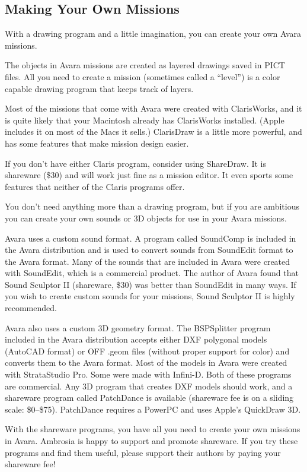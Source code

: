 \documentclass{article}
\begin{document}
\subsection{Making Your Own Missions}
With a drawing program and a little imagination, you can create your own Avara missions.

The objects in Avara missions are created as layered drawings saved in PICT files. All you need to create a mission (sometimes called a ``level'') is a color capable drawing program that keeps track of layers.

Most of the missions that come with Avara were created with ClarisWorks, and it is quite likely that your Macintosh already has ClarisWorks installed. (Apple includes it on most of the Macs it sells.) ClarisDraw is a little more powerful, and has some features that make mission design easier.

If you don't have either Claris program, consider using ShareDraw. It is shareware (\$30) and will work just fine as a mission editor. It even sports some features that neither of the Claris programs offer.

You don't need anything more than a drawing program, but if you are ambitious you can create your own sounds or 3D objects for use in your Avara missions.

Avara uses a custom sound format. A program called SoundComp is included in the Avara distribution and is used to convert sounds from SoundEdit format to the Avara format. Many of the sounds that are included in Avara were created with SoundEdit, which is a commercial product. The author of Avara found that Sound Sculptor II (shareware, \$30) was better than SoundEdit in many ways. If you wish to create custom sounds for your missions, Sound Sculptor II is highly recommended.

Avara also uses a custom 3D geometry format. The BSPSplitter program included in the Avara distribution accepts either DXF polygonal models (AutoCAD format) or OFF .geom files (without proper support for color) and converts them to the Avara format. Most of the models in Avara were created with StrataStudio Pro. Some were made with Infini-D. Both of these programs are commercial. Any 3D program that creates DXF models should work, and a shareware program called PatchDance is available (shareware fee is on a sliding scale: \$0--\$75). PatchDance requires a PowerPC and uses Apple's QuickDraw 3D.

With the shareware programs, you have all you need to create your own missions in Avara. Ambrosia is happy to support and promote shareware. If you try these programs and find them useful, please support their authors by paying your shareware fee!
\end{document}
